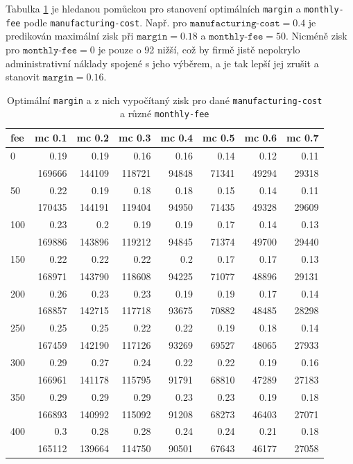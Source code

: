 \documentclass[a4wide,12pt]{report}
\begin{document}
Tabulka \ref{tab:max-profit2} je hledanou pomůckou pro stanovení optimálních \texttt{margin} a \texttt{monthly-fee} podle \texttt{manufacturing-cost}. Např. pro $\texttt{manufacturing-cost}=0.4$ je predikován maximální zisk při $\texttt{margin}=0.18$ a $\texttt{monthly-fee}=50$. Nicméně zisk pro $\texttt{monthly-fee}=0$ je pouze o 92 nižší, což by firmě jistě nepokrylo administrativní náklady spojené s jeho výběrem, a je tak lepší jej zrušit a stanovit $\texttt{margin}=0.16$.
\begin{table}[h]
\begin{center}
\begin{tabular}{|l|r|r|r|r|r|r|r|}
\hline
fee & \multicolumn{1}{l|}{mc 0.1} & \multicolumn{1}{l|}{mc 0.2} & \multicolumn{1}{l|}{mc 0.3} & \multicolumn{1}{l|}{mc 0.4} & \multicolumn{1}{l|}{mc 0.5} & \multicolumn{1}{l|}{mc 0.6} & \multicolumn{1}{l|}{mc 0.7} \\ \hline
0 & 0.19 & 0.19 & 0.16 & 0.16 & 0.14 & 0.12 & 0.11 \\ 
 & 169666 & 144109 & 118721 & 94848 & 71341 & 49294 & 29318 \\ \hline
50 & 0.22 & 0.19 & 0.18 & 0.18 & 0.15 & 0.14 & 0.11 \\ 
 & 170435 & 144191 & 119404 & 94950 & 71435 & 49328 & 29609 \\ \hline
100 & 0.23 & 0.2 & 0.19 & 0.19 & 0.17 & 0.14 & 0.13 \\ 
 & 169886 & 143896 & 119212 & 94845 & 71374 & 49700 & 29440 \\ \hline
150 & 0.22 & 0.22 & 0.22 & 0.2 & 0.17 & 0.17 & 0.13 \\ 
 & 168971 & 143790 & 118608 & 94225 & 71077 & 48896 & 29131 \\ \hline
200 & 0.26 & 0.23 & 0.23 & 0.19 & 0.19 & 0.17 & 0.14 \\ 
 & 168857 & 142715 & 117718 & 93675 & 70882 & 48485 & 28298 \\ \hline
250 & 0.25 & 0.25 & 0.22 & 0.22 & 0.19 & 0.18 & 0.14 \\ 
 & 167459 & 142190 & 117126 & 93269 & 69527 & 48065 & 27933 \\ \hline
300 & 0.29 & 0.27 & 0.24 & 0.22 & 0.22 & 0.19 & 0.16 \\ 
 & 166961 & 141178 & 115795 & 91791 & 68810 & 47289 & 27183 \\ \hline
350 & 0.29 & 0.29 & 0.29 & 0.23 & 0.23 & 0.19 & 0.18 \\ 
 & 166893 & 140992 & 115092 & 91208 & 68273 & 46403 & 27071 \\ \hline
400 & 0.3 & 0.28 & 0.28 & 0.24 & 0.24 & 0.21 & 0.18 \\ 
 & 165112 & 139664 & 114750 & 90501 & 67643 & 46177 & 27058 \\ \hline
\end{tabular}
\end{center}
\caption{Optimální \texttt{margin} a z nich vypočítaný zisk pro dané \texttt{manufacturing-cost} a různé \texttt{monthly-fee}}
\label{tab:max-profit2}
\end{table}
\end{document}
